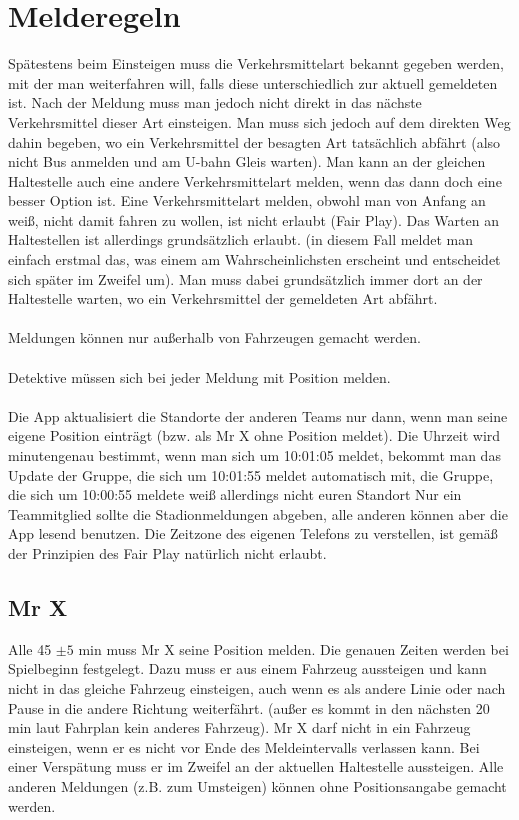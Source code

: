 \documentclass[12pt,a4paper]{article}
\begin{document}
\section{Melderegeln}
Spätestens beim Einsteigen muss die Verkehrsmittelart bekannt gegeben werden, mit der man weiterfahren will, falls diese unterschiedlich zur aktuell gemeldeten ist.
Nach der Meldung muss man jedoch nicht direkt in das nächste Verkehrsmittel dieser Art einsteigen.
Man muss sich jedoch auf dem direkten Weg dahin begeben, wo ein Verkehrsmittel der besagten Art tatsächlich abfährt
(also nicht Bus anmelden und am U-bahn Gleis warten).
Man kann an der gleichen Haltestelle auch eine andere Verkehrsmittelart melden, wenn das dann doch eine besser Option ist.
Eine Verkehrsmittelart melden, obwohl man von Anfang an weiß, nicht damit fahren zu wollen, ist nicht erlaubt (Fair Play).
Das Warten an Haltestellen ist allerdings grundsätzlich erlaubt. (in diesem Fall meldet man einfach erstmal das, was einem am Wahrscheinlichsten erscheint und entscheidet sich später im Zweifel um).
Man muss dabei grundsätzlich immer dort an der Haltestelle warten, wo ein Verkehrsmittel der gemeldeten Art abfährt.
\\
\\
Meldungen können nur außerhalb von Fahrzeugen gemacht werden.\\
\\
Detektive müssen sich bei jeder Meldung mit Position melden.\\
\\
Die App aktualisiert die Standorte der anderen Teams nur dann, wenn man seine eigene Position einträgt (bzw. als Mr X ohne Position meldet).
Die Uhrzeit wird minutengenau bestimmt, wenn man sich um 10:01:05 meldet, bekommt man das Update der Gruppe, die sich um 10:01:55 meldet automatisch mit, die Gruppe, die sich um 10:00:55 meldete weiß allerdings nicht euren Standort
Nur ein Teammitglied sollte die Stadionmeldungen abgeben, alle anderen können aber die App lesend benutzen.
Die Zeitzone des eigenen Telefons zu verstellen, ist gemäß der Prinzipien des Fair Play natürlich nicht erlaubt.

\subsection{Mr X}
Alle 45 $\pm 5$ min muss Mr X seine Position melden.
Die genauen Zeiten werden bei Spielbeginn festgelegt.
Dazu muss er aus einem Fahrzeug aussteigen und kann nicht in das gleiche Fahrzeug einsteigen, auch wenn es als andere Linie oder nach Pause in die andere Richtung weiterfährt. (außer es kommt in den nächsten 20 min laut Fahrplan kein anderes Fahrzeug).
Mr X darf nicht in ein Fahrzeug einsteigen, wenn er es nicht vor Ende des Meldeintervalls verlassen kann.
Bei einer Verspätung muss er im Zweifel an der aktuellen Haltestelle aussteigen.
Alle anderen Meldungen (z.B. zum Umsteigen) können ohne Positionsangabe gemacht werden.
\end{document}
